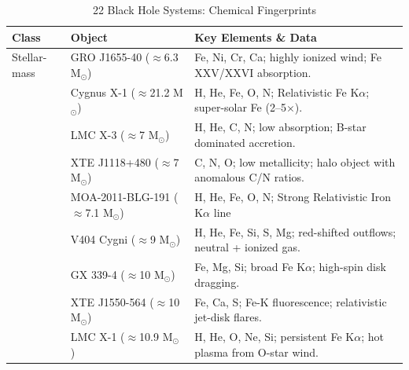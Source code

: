 \documentclass[12pt]{article}
\begin{document}
\begin{table}[H]
\centering
\small
\caption{22 Black Hole Systems: Chemical Fingerprints}
\begin{tabular}{l l p{7.5cm}}
\toprule
Class & Object & Key Elements \& Data \\
\midrule
Stellar-mass & GRO J1655-40 ($\approx$6.3 M$_\odot$) & Fe, Ni, Cr, Ca; highly ionized wind; Fe XXV/XXVI absorption. \\ 
& Cygnus X-1 ($\approx$21.2 M$_\odot$) & H, He, Fe, O, N; Relativistic Fe K$\alpha$; super-solar Fe (2--5$\times$). \\
& LMC X-3 ($\approx$7 M$_\odot$) & H, He, C, N; low absorption; B-star dominated accretion. \\
& XTE J1118+480 ($\approx$7 M$_\odot$) & C, N, O; low metallicity; halo object with anomalous C/N ratios. \\
& MOA-2011-BLG-191 ($\approx$7.1 M$_\odot$) & H, He, Fe, O, N; Strong Relativistic Iron K$\alpha$ line \\
& V404 Cygni ($\approx$9 M$_\odot$) & H, He, Fe, Si, S, Mg; red-shifted outflows; neutral + ionized gas. \\
& GX 339-4 ($\approx$10 M$_\odot$) & Fe, Mg, Si; broad Fe K$\alpha$; high-spin disk dragging. \\
& XTE J1550-564 ($\approx$10 M$_\odot$) & Fe, Ca, S; Fe-K fluorescence; relativistic jet-disk flares. \\
& LMC X-1 ($\approx$10.9 M$_\odot$) & H, He, O, Ne, Si; persistent Fe K$\alpha$; hot plasma from O-star wind. \\


\end{tabular}
\end{table}
\end{document}
